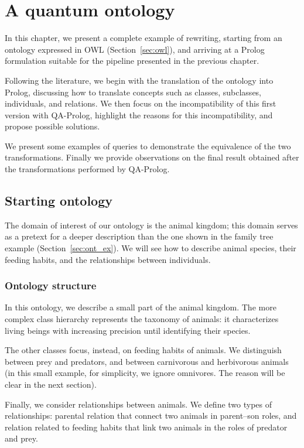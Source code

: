\chapter{A quantum ontology}
\label{ch:qa_ont}
In this chapter, we present a complete example of rewriting, starting from an ontology expressed in OWL (Section~\ref{sec:owl}), and arriving at a Prolog formulation suitable for the pipeline presented in the previous chapter.

Following the literature, we begin with the translation of the ontology into Prolog, discussing how to translate concepts such as classes, subclasses, individuals, and relations. We then focus on the incompatibility of this first version with QA-Prolog, highlight the reasons for this incompatibility, and propose possible solutions.

We present some examples of queries to demonstrate the equivalence of the two transformations. Finally we provide observations on the final result obtained after the transformations performed by QA-Prolog.

\section{Starting ontology}
The domain of interest of our ontology is the animal kingdom; this domain serves as a pretext for a deeper description than the one shown in the family tree example (Section~\ref{sec:ont_ex}). We will see how to describe animal species, their feeding habits, and the relationships between individuals.

\subsection{Ontology structure}
In this ontology, we describe a small part of the animal kingdom. The more complex class hierarchy represents the taxonomy of animals: it characterizes living beings with increasing precision until identifying their species.

The other classes focus, instead, on feeding habits of animals. We distinguish between prey and predators, and between carnivorous and herbivorous animals (in this small example, for simplicity, we ignore omnivores. The reason will be clear in the next section).

Finally, we consider relationships between animals. We define two types of relationships: parental relation that connect two animals in parent–son roles, and relation related to feeding habits that link two animals in the roles of predator and prey.

